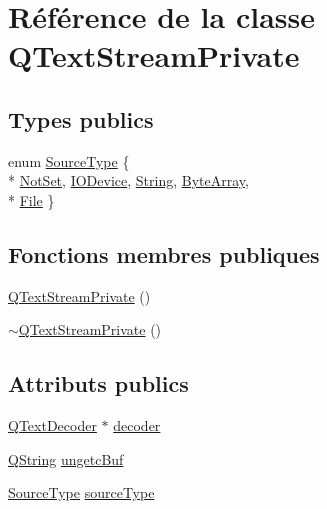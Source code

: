 \hypertarget{class_q_text_stream_private}{}\section{Référence de la classe Q\+Text\+Stream\+Private}
\label{class_q_text_stream_private}
\subsection*{Types publics}
\begin{DoxyCompactItemize}
\item 
enum \hyperlink{class_q_text_stream_private_a3b6df983eaaeac7f2fd44fa4bc50dcb3}{Source\+Type} \{ \\*
\hyperlink{class_q_text_stream_private_a3b6df983eaaeac7f2fd44fa4bc50dcb3a99b4ad58ca2e259f91651a4725ad383b}{Not\+Set}, 
\hyperlink{class_q_text_stream_private_a3b6df983eaaeac7f2fd44fa4bc50dcb3ad65973be91ad4ef118ca35e8e7aa9460}{I\+O\+Device}, 
\hyperlink{class_q_text_stream_private_a3b6df983eaaeac7f2fd44fa4bc50dcb3afe37a74efcc18c5666b593f63fb0d4b8}{String}, 
\hyperlink{class_q_text_stream_private_a3b6df983eaaeac7f2fd44fa4bc50dcb3a63a04e65c212774b30ffaa6d451c1c81}{Byte\+Array}, 
\\*
\hyperlink{class_q_text_stream_private_a3b6df983eaaeac7f2fd44fa4bc50dcb3a7558ef07c068e9ca9f8daeaacc02c0c3}{File}
 \}
\end{DoxyCompactItemize}
\subsection*{Fonctions membres publiques}
\begin{DoxyCompactItemize}
\item 
\hyperlink{class_q_text_stream_private_a93804eb489ea5664b622ca153fbd0191}{Q\+Text\+Stream\+Private} ()
\item 
\hyperlink{class_q_text_stream_private_ac1eff218f4e36edc65a90c10178af486}{$\sim$\+Q\+Text\+Stream\+Private} ()
\end{DoxyCompactItemize}
\subsection*{Attributs publics}
\begin{DoxyCompactItemize}
\item 
\hyperlink{class_q_text_decoder}{Q\+Text\+Decoder} $\ast$ \hyperlink{class_q_text_stream_private_a26f177d9d556e804854965740c4897e8}{decoder}
\item 
\hyperlink{class_q_string}{Q\+String} \hyperlink{class_q_text_stream_private_a5657edc4d5707027c62d9ef391749a39}{ungetc\+Buf}
\item 
\hyperlink{class_q_text_stream_private_a3b6df983eaaeac7f2fd44fa4bc50dcb3}{Source\+Type} \hyperlink{class_q_text_stream_private_ad36a4145a8b62bed2dbf661b1e5f8aa7}{source\+Type}
\end{DoxyCompactItemize}


